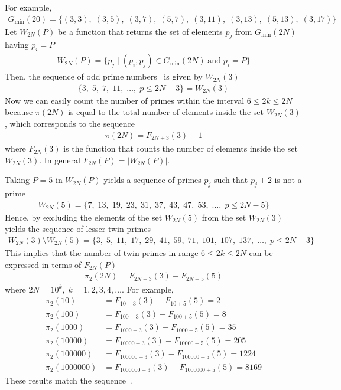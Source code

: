 For example,
\begin{align*}
    G_{\min}(20) = \{
    (3,3),\;
    (3,5),\;
    (3,7),\;
    (5,7),\;
    (3,11),\;
    (3,13),\;
    (5,13),\;
    (3,17)
    \}
\end{align*}
Let $W_{2N}(P)$ be a function that returns the set of elements $p_j$ from $G_{\min} (2N)$ having $p_i=P$
\begin{align*}
    W_{2N}(P) = \{p_j \mid (p_i, p_j) \in G_{\min} (2N) \; \mathrm{and} \; p_i = P \}
\end{align*}
Then, the sequence of odd prime numbers~\cite{oeis:A065091} is given by $W_{2N}(3)$
\begin{align*}
    \{ 3, \; 5, \; 7, \; 11, \; \dots, \; p \leq 2N - 3\} = W_{2N}(3)
\end{align*}
Now we can easily count the number of primes within the interval $6 \leq 2k \leq 2N$ because $\pi(2N)$ is equal to
the total number of elements inside the set $W_{2N}(3)$, which corresponds to the sequence~\cite{oeis_A000720}
\begin{align*}
    \pi(2N) = F_{2N+3}(3) + 1
\end{align*}
where $F_{2N}(3)$ is the function that counts the number of elements inside the set $W_{2N}(3)$.
In general $F_{2N}(P) = |W_{2N}(P)|$.

Taking $P=5$ in $W_{2N}(P)$ yields a sequence of primes $p_j$ such that $p_j+2$ is not a prime~\cite{oeis:A049591}
\begin{align*}
    W_{2N}(5) = \{ 7, \; 13, \; 19, \; 23, \; 31, \; 37, \; 43, \; 47, \; 53, \; \dots, \;  p \leq 2N - 5 \}
\end{align*}
Hence, by excluding the elements of the set $W_{2N}(5)$ from the set $W_{2N}(3)$ yields the sequence of
lesser twin primes~\cite{oeis:A001359}
\begin{align*}
    W_{2N}(3) \setminus W_{2N}(5) = \{ 3, \; 5, \; 11, \; 17, \; 29, \; 41, \; 59, \; 71, \; 101, \; 107, \; 137, \; \dots, \;  p \leq 2N - 3 \}
\end{align*}
This implies that the number of twin primes in range $6 \leq 2k \leq 2N$ can be expressed in terms of $F_{2N}(P)$
\begin{align*}
    \pi_2 (2N) = F_{2N+3}(3) - F_{2N+5}(5)
\end{align*}
where $2N=10^k, \; k=1,2,3,4,\dots$.
For example,
\begin{align*}
    \pi_2 (10) &= F_{10+3}(3) - F_{10+5}(5) = 2 \\
    \pi_2 (100) &= F_{100+3}(3) - F_{100+5}(5) = 8 \\
    \pi_2 (1000) &= F_{1000+3}(3) - F_{1000+5}(5) = 35 \\
    \pi_2 (10000) &= F_{10000+3}(3) - F_{10000+5}(5) = 205 \\
    \pi_2 (100000) &= F_{100000+3}(3) - F_{100000+5}(5) = 1224 \\
    \pi_2 (1000000) &= F_{1000000+3}(3) - F_{1000000+5}(5) = 8169
\end{align*}
These results match the sequence~\cite{oeis_A007508}.

